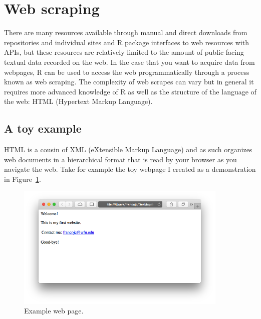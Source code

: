 \documentclass[
  letterpaper,
]{latex/krantz}
\begin{document}
\hypertarget{web-scraping}{%
\section{Web scraping}\label{web-scraping}}

There are many resources available through manual and direct downloads
from repositories and individual sites and R package interfaces to web
resources with APIs, but these resources are relatively limited to the
amount of public-facing textual data recorded on the web. In the case
that you want to acquire data from webpages, R can be used to access the
web programmatically through a process known as web scraping. The
complexity of web scrapes can vary but in general it requires more
advanced knowledge of R as well as the structure of the language of the
web: HTML (Hypertext Markup Language).

\hypertarget{a-toy-example}{%
\subsection{A toy example}\label{a-toy-example}}

HTML is a cousin of XML (eXtensible Markup Language) and as such
organizes web documents in a hierarchical format that is read by your
browser as you navigate the web. Take for example the toy webpage I
created as a demonstration in Figure~\ref{fig-ad-example-webpage}.

\begin{figure}

{\centering \includegraphics[width=0.9\textwidth,height=\textheight]{./figures/acquire-data/example-webpage.png}

}

\caption{\label{fig-ad-example-webpage}Example web page.}

\end{figure}
\end{document}
